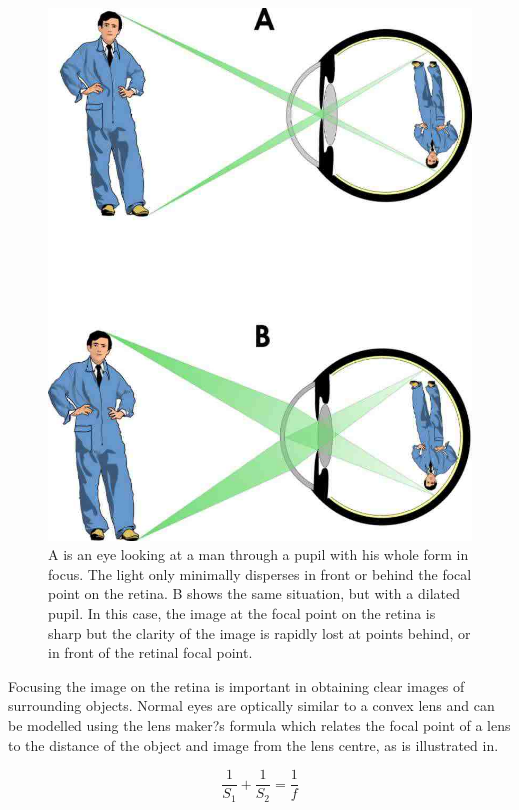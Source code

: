 \begin{figure}[!ht]
\centering
  \includegraphics{figures/light_path}
\caption{A is an eye looking at a man through a pupil with his whole form in focus.
		The light only minimally disperses in front or behind the focal point
		on the retina. B shows the same situation, but with a dilated pupil.
		In this case, the image at the focal point on the retina is sharp but
		the clarity of the image is rapidly lost at points behind, or in front
		of the retinal focal point.}
\label{fig:light_journey}
\end{figure}

Focusing the image on the retina is important in obtaining clear images of
surrounding objects. Normal eyes are optically similar to a convex lens and
can be modelled using the lens maker?s formula 
which relates the focal point of a lens to the distance of the object and
image from the lens centre, as is illustrated in.

\begin{equation}
\frac{1}{S_1} + \frac{1}{S_2} = \frac{1}{f}
\label{eq:lens_makers}
\end{equation}

